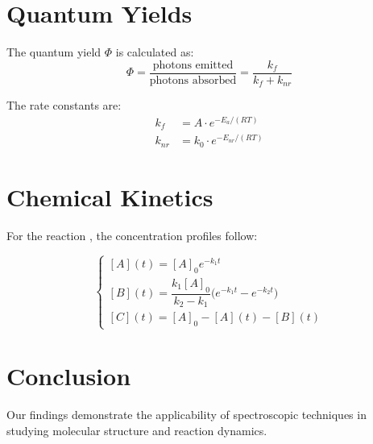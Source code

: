 \documentclass{article}
\begin{document}
\section{Quantum Yields}

The quantum yield $\Phi$ is calculated as:
\begin{equation}
\Phi = \frac{\text{photons emitted}}{\text{photons absorbed}}
     = \frac{k_f}{k_f + k_{nr}} \label{eq:quantum_yield}
\end{equation}

The rate constants are:
\begin{align}
k_f &= A \cdot e^{-E_a/(RT)} \label{eq:k_f} \\
k_{nr} &= k_0 \cdot e^{-E_{nr}/(RT)} \label{eq:k_nr}
\end{align}

\section{Chemical Kinetics}

For the reaction , the concentration profiles follow:

\begin{equation}
\begin{cases}
[A](t) = [A]_0 e^{-k_1 t} \\
[B](t) = \dfrac{k_1[A]_0}{k_2 - k_1}\bigl(e^{-k_1 t} - e^{-k_2 t}\bigr) \\
[C](t) = [A]_0 - [A](t) - [B](t)
\end{cases} \label{eq:kinetics}
\end{equation}

\section{Conclusion}

Our findings demonstrate the applicability of spectroscopic techniques
in studying molecular structure and reaction dynamics.



\end{document}
